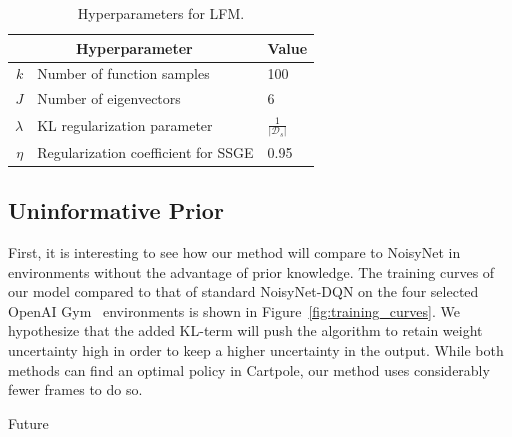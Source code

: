 \documentclass[]{uai2021} %
\begin{document}
\begin{table}
    \centering
    \caption{Hyperparameters for LFM.}\label{tab:hyperparams}
    \begin{tabular}{rll}
      \toprule %
      \multicolumn{2}{c}{Hyperparameter} & Value \\
      \midrule %
      \(k\)         & Number of function samples & 100\\
      \(J\)         & Number of eigenvectors & 6\\
      \(\lambda\)   & KL regularization parameter & \(\frac{1}{\lvert \mathcal{D}_s \rvert}\)\\
      \(\eta\)      & Regularization coefficient for SSGE & 0.95\\
      \bottomrule %
    \end{tabular}
\end{table}


\subsection{Uninformative Prior}
First, it is interesting to see how our method will compare to NoisyNet
in environments without the advantage of prior knowledge. The training curves
of our model compared to that of standard NoisyNet-DQN on the four selected OpenAI
Gym~\citep{brockman_openai_2016} environments is shown in Figure~\ref{fig:training_curves}.
We hypothesize that the added KL-term will push the algorithm to retain weight uncertainty high
in order to keep a higher uncertainty in the output. While both methods can
find an optimal policy in Cartpole, our method uses considerably fewer frames
to do so.

Future 
\end{document}
